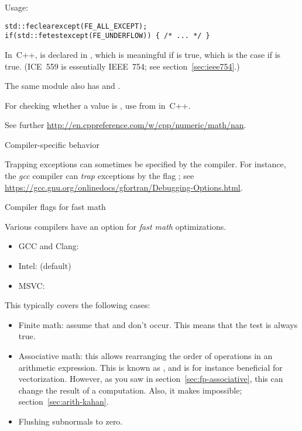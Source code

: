 Usage:

\begin{lstlisting}
std::feclearexcept(FE_ALL_EXCEPT);
if(std::fetestexcept(FE_UNDERFLOW)) { /* ... */ }
\end{lstlisting}

In~C++,  is declared in
, which is meaningful if
 is true, which is the case if
 is true. (ICE~559 is essentially
IEEE~754; see section~\ref{sec:ieee754}.)

The same module also has  and .

For checking whether a value is , use  from  in~C++.

See further \url{http://en.cppreference.com/w/cpp/numeric/math/nan}.

 {Compiler-specific behavior}

Trapping exceptions can sometimes be specified by the compiler.
For instance, the \emph{gcc} compiler can
\emph{trap}
exceptions by the flag
;
see \url{https://gcc.gnu.org/onlinedocs/gfortran/Debugging-Options.html}.

 {Compiler flags for fast math}

Various compilers have an option for
\emph{fast math}
optimizations.

\begin{itemize}
\item GCC and Clang: 
\item Intel:  (default)
\item MSVC: 
\end{itemize}

This typically covers the following cases:
\begin{itemize}
\item Finite math: assume that  and  don't occur.
  This means that the test  is always true.
\item Associative math: this allows rearranging the order of operations
  in an arithmetic expression.
  This is known as , and is for instance
  beneficial for vectorization.
  However, as you saw in  section~\ref{sec:fp-associative},
  this can change the result of a computation.
  Also, it makes  impossible;
  section~\ref{sec:arith-kahan}.
\item Flushing subnormals to zero.
\end{itemize}

